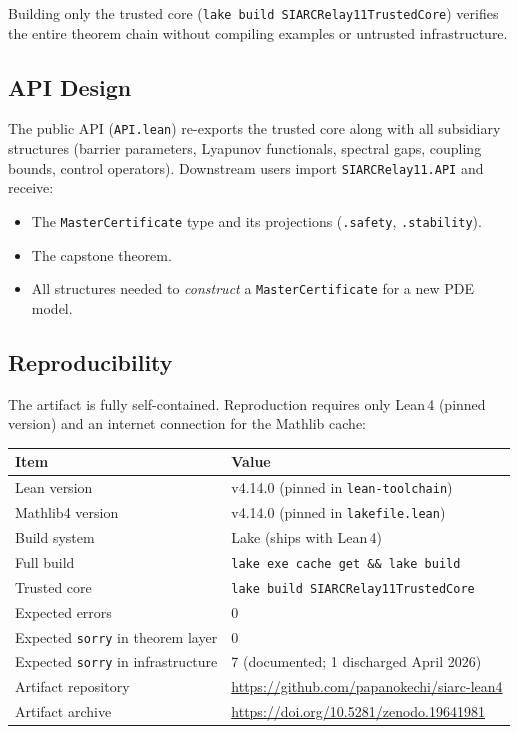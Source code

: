 \documentclass[11pt,a4paper]{article}
\theoremstyle{plain}
\theoremstyle{definition}
\theoremstyle{remark}
\newcommand{\sorry}{\texttt{sorry}}
\newcommand{\leaninline}[1]{\texttt{#1}}
\begin{document}
Building only the trusted core (\texttt{lake build SIARCRelay11TrustedCore})
verifies the entire theorem chain without compiling examples or untrusted
infrastructure.

\subsection{API Design}

The public API (\leaninline{API.lean}) re-exports the trusted core along
with all subsidiary structures (barrier parameters, Lyapunov functionals,
spectral gaps, coupling bounds, control operators).  Downstream users
import \leaninline{SIARCRelay11.API} and receive:

\begin{itemize}
  \item The \leaninline{MasterCertificate} type and its projections
    (\leaninline{.safety}, \leaninline{.stability}).
  \item The capstone theorem.
  \item All structures needed to \emph{construct} a
    \leaninline{MasterCertificate} for a new PDE model.
\end{itemize}

\subsection{Reproducibility}

The artifact is fully self-contained.  Reproduction requires only Lean\,4
(pinned version) and an internet connection for the Mathlib cache:

\begin{center}
\begin{tabular}{ll}
  \toprule
  Item & Value \\
  \midrule
  Lean version & v4.14.0 (pinned in \texttt{lean-toolchain}) \\
  Mathlib4 version & v4.14.0 (pinned in \texttt{lakefile.lean}) \\
  Build system & Lake (ships with Lean\,4) \\
  Full build & \texttt{lake exe cache get \&\& lake build} \\
  Trusted core & \texttt{lake build SIARCRelay11TrustedCore} \\
  Expected errors & 0 \\
  Expected \sorry{} in theorem layer & 0 \\
  Expected \sorry{} in infrastructure & 7 (documented; 1 discharged April 2026) \\
  Artifact repository & \url{https://github.com/papanokechi/siarc-lean4} \\
  Artifact archive & \url{https://doi.org/10.5281/zenodo.19641981} \\
  \bottomrule
\end{tabular}
\end{center}
\end{document}
